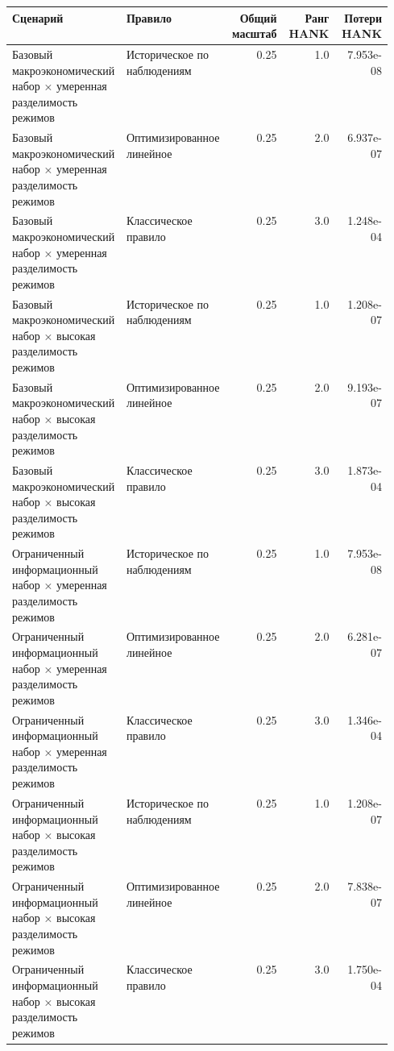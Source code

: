 \begin{tabular}{p{0.30\linewidth}p{0.25\linewidth}rrr}
\toprule
Сценарий & Правило & Общий масштаб & Ранг HANK & Потери HANK \\
\midrule
Базовый макроэкономический набор × умеренная разделимость режимов & Историческое по наблюдениям & 0.25 & 1.0 & 7.953e-08 \\
Базовый макроэкономический набор × умеренная разделимость режимов & Оптимизированное линейное & 0.25 & 2.0 & 6.937e-07 \\
Базовый макроэкономический набор × умеренная разделимость режимов & Классическое правило & 0.25 & 3.0 & 1.248e-04 \\
Базовый макроэкономический набор × высокая разделимость режимов & Историческое по наблюдениям & 0.25 & 1.0 & 1.208e-07 \\
Базовый макроэкономический набор × высокая разделимость режимов & Оптимизированное линейное & 0.25 & 2.0 & 9.193e-07 \\
Базовый макроэкономический набор × высокая разделимость режимов & Классическое правило & 0.25 & 3.0 & 1.873e-04 \\
Ограниченный информационный набор × умеренная разделимость режимов & Историческое по наблюдениям & 0.25 & 1.0 & 7.953e-08 \\
Ограниченный информационный набор × умеренная разделимость режимов & Оптимизированное линейное & 0.25 & 2.0 & 6.281e-07 \\
Ограниченный информационный набор × умеренная разделимость режимов & Классическое правило & 0.25 & 3.0 & 1.346e-04 \\
Ограниченный информационный набор × высокая разделимость режимов & Историческое по наблюдениям & 0.25 & 1.0 & 1.208e-07 \\
Ограниченный информационный набор × высокая разделимость режимов & Оптимизированное линейное & 0.25 & 2.0 & 7.838e-07 \\
Ограниченный информационный набор × высокая разделимость режимов & Классическое правило & 0.25 & 3.0 & 1.750e-04 \\
\bottomrule
\end{tabular}